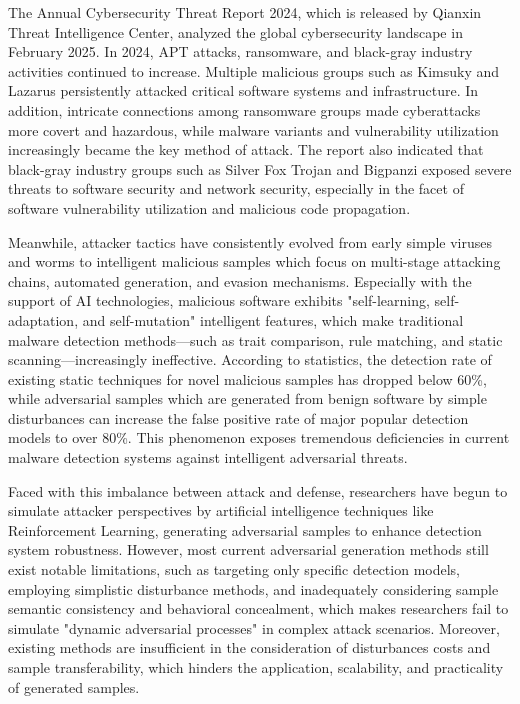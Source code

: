 The Annual Cybersecurity Threat Report 2024, which is released by Qianxin Threat Intelligence Center, analyzed the global cybersecurity landscape in February 2025. In 2024, APT attacks, ransomware, and black-gray industry activities continued to increase. Multiple malicious groups such as Kimsuky and Lazarus persistently attacked critical software systems and infrastructure. In addition, intricate connections among ransomware groups made cyberattacks more covert and hazardous, while malware variants and vulnerability utilization increasingly became the key method of attack. The report also indicated that black-gray industry groups such as Silver Fox Trojan and Bigpanzi exposed severe threats to software security and network security, especially in the facet of software vulnerability utilization and malicious code propagation.

Meanwhile, attacker tactics have consistently evolved from early simple viruses and worms to intelligent malicious samples which focus on multi-stage attacking chains, automated generation, and evasion mechanisms. Especially with the support of AI technologies, malicious software exhibits "self-learning, self-adaptation, and self-mutation" intelligent features, which make traditional malware detection methods—such as trait comparison, rule matching, and static scanning—increasingly ineffective\cite{chen2018study, ren2021matching, lipp2022empirical}. According to statistics, the detection rate of existing static techniques for novel malicious samples has dropped below 60\%, while adversarial samples which are generated from benign software by simple disturbances can increase the false positive rate of major popular detection models to over 80\%. This phenomenon exposes tremendous deficiencies in current malware detection systems against intelligent adversarial threats.

Faced with this imbalance between attack and defense, researchers have begun to simulate attacker perspectives by artificial intelligence techniques like Reinforcement Learning, generating adversarial samples to enhance detection system robustness. However, most current adversarial generation methods still exist notable limitations, such as targeting only specific detection models, employing simplistic disturbance methods, and inadequately considering sample semantic consistency and behavioral concealment, which makes researchers fail to simulate "dynamic adversarial processes" in complex attack scenarios\cite{yu2022natural, ilahi2021challenges, labaca2021aimed,standen2025adversarial}. Moreover, existing methods are insufficient in the consideration of disturbances costs and sample transferability, which hinders the application, scalability, and practicality of generated samples.

